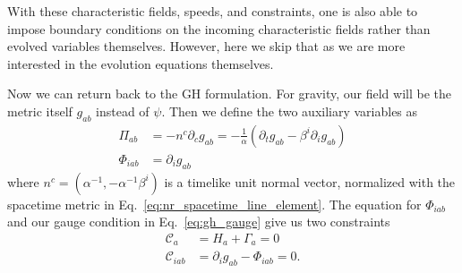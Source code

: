 \begin{bibunit}[unsrtnat]
With these characteristic fields, speeds, and constraints, one is also able to
impose boundary conditions on the incoming characteristic fields rather than
evolved variables themselves. However, here we skip that as we are more
interested in the evolution equations themselves.

Now we can return back to the GH formulation. For gravity, our field will be the
metric itself $g_{ab}$ instead of $\psi$. Then we define the two auxiliary
variables as
\begin{align}
   \Pi_{ab} &= -n^c\partial_c g_{ab} = -\frac{1}{\alpha}\left(\partial_t g_{ab}
      - \beta^i\partial_i g_{ab}\right) \label{eq:gh_pi_no_damp}\\
   \Phi_{iab} &= \partial_i g_{ab}
\end{align}
where $n^c=(\alpha^{-1},-\alpha^{-1}\beta^i)$ is a timelike unit normal vector,
normalized with the spacetime metric in Eq.~\ref{eq:nr_spacetime_line_element}.
The equation for $\Phi_{iab}$ and our gauge condition in Eq.~\ref{eq:gh_gauge}
give us two constraints
\begin{align}
   \mathcal{C}_a &= H_a + \Gamma_a = 0 \\
   \mathcal{C}_{iab} &= \partial_i g_{ab} - \Phi_{iab} = 0 .
\end{align}


\end{bibunit}
